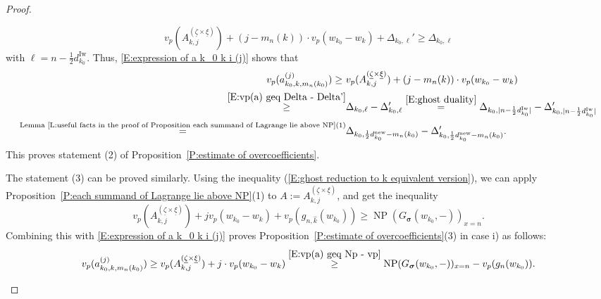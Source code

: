 \documentclass[12pt]{amsart}
\theoremstyle{definition}
\numberwithin{equation}{subsection}
\DeclareMathOperator{\NP}{NP}
\newcommand{\bbsigma}{\boldsymbol{\sigma}}
\newcommand{\new}{\mathrm{new}}
\newcommand{\Iw}{\mathrm{Iw}}
\begin{document}
\begin{proof}
\begin{enumerate}[i)]
\begin{equation}
\label{E:vp(a) geq Delta - Delta'}
v_p(A_{k,j}^{(\underline \zeta\times \underline \xi)})+(j-m_n(k))\cdot v_p(w_{k_0}-w_k)+\Delta_{k_0,\ell}'\geq \Delta_{k_0,\ell}
\end{equation}
with $\ell=n-\tfrac 12 d_{k_0}^\Iw$. 
Thus, \eqref{E:expression of a k_0 k i (j)} shows that
\begin{align*}
v_p(a_{k_0,k,m_n(k_0)}^{(j)})\geq \ & v_p(A_{k,j}^{(\underline \zeta \times\underline\xi)}) + (j-m_n(k)
) \cdot v_p(w_{k_0}-w_k)
\\
\stackrel{\eqref{E:vp(a) geq Delta - Delta'}}\geq & \Delta_{k_0,\ell} - \Delta'_{k_0, \ell} \stackrel{\eqref{E:ghost duality}} = \Delta_{k_0,|n-\frac 12d_{k_0}^\Iw|} - \Delta'_{k_0, |n-\frac 12d_{k_0}^\Iw|}\\
\stackrel{\textrm{Lemma~\ref{L:useful facts in the proof of Proposition each summand of Lagrange lie above NP}(1)}}= &\Delta_{k_0,\frac 12 d_{k_0}^\new-m_n(k_0)}-\Delta_{k_0,\frac 12 d_{k_0}^\new-m_n(k_0)}'.
\end{align*}
This proves statement (2) of Proposition~\ref{P:estimate of overcoefficients}.

The statement (3) can be proved similarly. Using the inequality (\ref{E:ghost reduction to k equivalent version}), we can apply Proposition~\ref{P:each summand of Lagrange lie above NP}(1) to $A:=A_{k,j}^{(\underline \zeta\times \underline \xi)}$, and get the inequality
\begin{equation}
\label{E:vp(a) geq Np - vp}
v_p(A_{k,j}^{(\underline \zeta\times \underline \xi)})+jv_p(w_{k_0}-w_k)+v_p(g_{n,\hat{ k}}(w_{k_0}))\geq \NP(G_{\bbsigma}(w_{k_0},-))_{x=n}.
\end{equation}
Combining this with \eqref{E:expression of a k_0 k i (j)} proves Proposition~\ref{P:estimate of overcoefficients}(3) in case i) as follows:
$$
v_p(a_{k_0,k,m_n(k_0)}^{(j)})\geq v_p(A_{k,j}^{(\underline \zeta \times\underline\xi)}) + j \cdot v_p(w_{k_0}-w_k)
\stackrel{\eqref{E:vp(a) geq Np - vp}}\geq  \NP(G_{\bbsigma}(w_{k_0},-))_{x=n}-v_p(g_n(w_{k_0})).
$$


\end{enumerate}
\end{proof}
\end{document}

